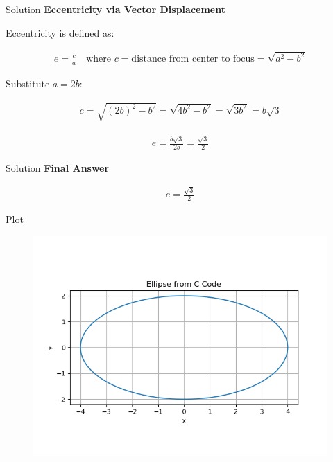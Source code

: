 \documentclass{beamer}
\begin{document}
\begin{frame}{Solution}
\textbf{Eccentricity via Vector Displacement}

Eccentricity is defined as:


\begin{align}
e = \frac{c}{a}
\quad \text{where } c = \text{distance from center to focus} = \sqrt{a^2 - b^2}
\end{align}

Substitute $a = 2b$:

\begin{align}
c = \sqrt{(2b)^2 - b^2} = \sqrt{4b^2 - b^2} = \sqrt{3b^2} = b\sqrt{3}
\end{align}

\begin{align}
e = \frac{b\sqrt{3}}{2b} = \frac{\sqrt{3}}{2}
\end{align}
\end{frame}


\begin{frame}{Solution}
\textbf{Final Answer}

\begin{align}
\boxed{e = \frac{\sqrt{3}}{2}}
\end{align}
\end{frame}



\begin{frame}{Plot}
    \begin{figure}
        \centering
        \includegraphics[width=0.7\linewidth]{./figs/Figure_1.png}
        \caption{}
        \label{fig:fig1}
    \end{figure}
\end{frame}
\end{document}
